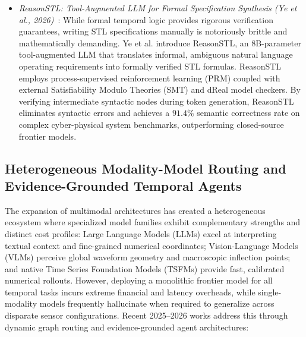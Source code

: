 \begin{itemize}[leftmargin=*]
    \item \emph{ReasonSTL: Tool-Augmented LLM for Formal Specification Synthesis (Ye et al., 2026)}~\cite{ye2026reasonstl}: While formal temporal logic provides rigorous verification guarantees, writing STL specifications manually is notoriously brittle and mathematically demanding. Ye et al. introduce ReasonSTL, an 8B-parameter tool-augmented LLM that translates informal, ambiguous natural language operating requirements into formally verified STL formulas. ReasonSTL employs process-supervised reinforcement learning (PRM) coupled with external Satisfiability Modulo Theories (SMT) and dReal model checkers. By verifying intermediate syntactic nodes during token generation, ReasonSTL eliminates syntactic errors and achieves a $91.4\%$ semantic correctness rate on complex cyber-physical system benchmarks, outperforming closed-source frontier models.
\end{itemize}

\subsection{Heterogeneous Modality-Model Routing and Evidence-Grounded Temporal Agents}
\label{sec:heterogeneous_routing_evidence_agents}

The expansion of multimodal architectures has created a heterogeneous ecosystem where specialized model families exhibit complementary strengths and distinct cost profiles: Large Language Models (LLMs) excel at interpreting textual context and fine-grained numerical coordinates; Vision-Language Models (VLMs) perceive global waveform geometry and macroscopic inflection points; and native Time Series Foundation Models (TSFMs) provide fast, calibrated numerical rollouts. However, deploying a monolithic frontier model for all temporal tasks incurs extreme financial and latency overheads, while single-modality models frequently hallucinate when required to generalize across disparate sensor configurations. Recent 2025--2026 works address this through dynamic graph routing and evidence-grounded agent architectures:


